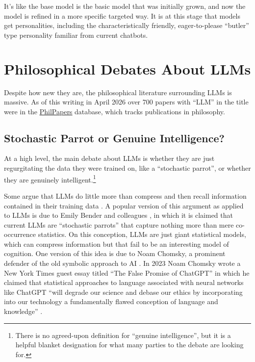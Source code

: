 It's like the base model is the basic model that was initially grown, and now the model is refined in a more specific targeted way. It is at this stage that models get personalities, including the characteristically friendly, eager-to-please ``butler'' type personality familiar from current chatbots.


\section{Philosophical Debates About LLMs}

Despite how new they are, the philosophical literature surrounding LLMs is massive. As of this writing in April 2026 over 700 papers with ``LLM'' in the title were in the \href{https://philpapers.org/}{\underline{PhilPapers}} database, which tracks publications in philosophy.

\subsection{Stochastic Parrot or Genuine Intelligence?}

At a high level, the main debate about LLMs is whether they are just
regurgitating the data they were trained on, like a ``stochastic parrot'', or whether they are
genuinely intelligent.\footnote{There is no agreed-upon definition for ``genuine intelligence'', but it is a helpful blanket designation for what many parties to the debate are looking for.}

Some argue that LLMs do little more than
compress and then recall information contained in their training data
\cite{bender2021dangers, chiang2023jpeg}. A popular version of this argument
as applied to LLMs is due to Emily Bender and colleagues
\cite{bender2021dangers}, in which it is claimed that current LLMs are
``stochastic parrots'' that capture nothing more than mere co-occurrence
statistics. On this conception, LLMs are just giant statistical
models, which can compress information but that fail to be an interesting model of cognition.
One version of this idea is due to Noam Chomsky, a prominent defender of the old symbolic approach to AI \cite{king2024large}. In 2023 Noam Chomsky
wrote a New York Times guest essay titled
``The False Promise of ChatGPT'' in which he claimed that statistical
approaches to language associated with neural networks like ChatGPT ``will degrade our science and
debase our ethics by incorporating into our technology a fundamentally flawed
conception of language and knowledge'' \cite{chomsky2023noam}.

